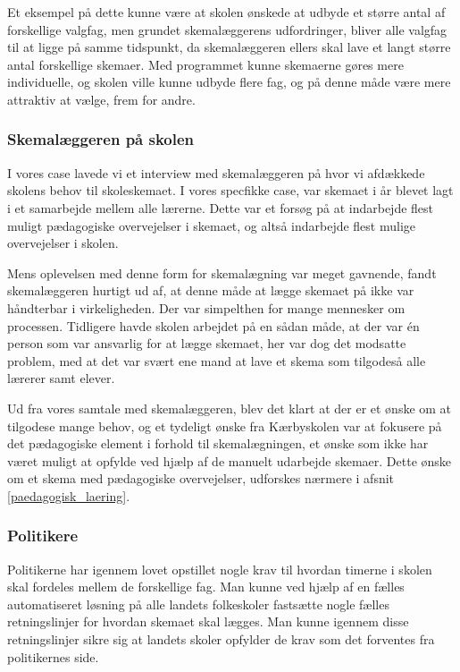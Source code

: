 Et eksempel på dette kunne være at skolen ønskede at udbyde et større antal af forskellige valgfag, men grundet skemalæggerens udfordringer, bliver alle valgfag til at ligge på samme tidspunkt, da skemalæggeren ellers skal lave et langt større antal forskellige skemaer. Med programmet kunne skemaerne gøres mere individuelle, og skolen ville kunne udbyde flere fag, og på denne måde være mere attraktiv at vælge, frem for andre.

\subsubsection{Skemalæggeren på skolen}
I vores case lavede vi et interview med skemalæggeren på \school hvor vi afdækkede skolens behov til skoleskemaet. I vores specfikke case, var skemaet i år blevet lagt i et samarbejde mellem alle lærerne. Dette var et forsøg på at indarbejde flest muligt pædagogiske overvejelser i skemaet, og altså indarbejde flest mulige overvejelser i skolen.

Mens oplevelsen med denne form for skemalægning var meget gavnende, fandt skemalæggeren hurtigt ud af, at denne måde at lægge skemaet på ikke var håndterbar i virkeligheden. Der var simpelthen for mange mennesker om processen. Tidligere havde skolen arbejdet på en sådan måde, at der var \'en person som var ansvarlig for at lægge skemaet, her var dog det modsatte problem, med at det var svært ene mand at lave et skema som tilgodeså alle lærerer samt elever.

Ud fra vores samtale med skemalæggeren, blev det klart at der er et ønske om at tilgodese mange behov, og et tydeligt ønske fra Kærbyskolen var at fokusere på det pædagogiske element i forhold til skemalægningen, et ønske som ikke har været muligt at opfylde ved hjælp af de manuelt udarbejde skemaer. Dette ønske om et skema med pædagogiske overvejelser, udforskes nærmere i afsnit \ref{paedagogisk_laering}.



\subsubsection{Politikere}
Politikerne har igennem lovet opstillet nogle krav til hvordan timerne i skolen skal fordeles mellem de forskellige fag. Man kunne ved hjælp af en fælles automatiseret løsning på alle landets folkeskoler fastsætte nogle fælles retningslinjer for hvordan skemaet skal lægges. Man kunne igennem disse retningslinjer sikre sig at landets skoler opfylder de krav som det forventes fra politikernes side. 

